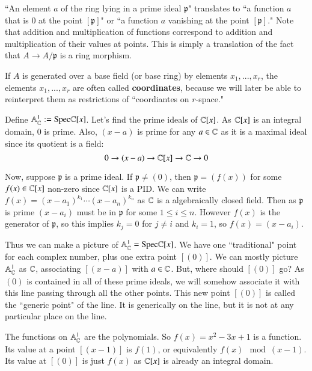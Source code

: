 ``An element $a$ of the ring lying in a prime ideal $\mathfrak{p}$" translates to ``a function $a$ that is $0$ at the point $[\mathfrak{p}]$" or ``a function $a$ vanishing at the point $[\mathfrak{p}]$." Note that addition and multiplication of functions correspond to addition and multiplication of their values at points. This is simply a translation of the fact that $A\rightarrow A/\mathfrak{p}$ is a ring morphism. 

If $A$ is generated over a base field (or base ring) by elements $x_1,...,x_r$, the elements $x_1,...,x_r$ are often called \textbf{coordinates}, because we will later be able to reinterpret them as restrictions of ``coordiantes on $r$-space."

\begin{example}
    Define $\mathbb{A}_{\mathbb C}^1 := \text{Spec} \mathbb C[x]$. Let's find the prime ideals of $\mathbb C[x]$. As $\mathbb C[x]$ is an integral domain, $0$ is prime. Also, $(x-a)$ is prime for any $a \in \mathbb C$ as it is a maximal ideal since its quotient is a field: $$0 \rightarrow (x-a)\rightarrow \mathbb C[x]\rightarrow \mathbb C\rightarrow 0$$

    Now, suppose $\mathfrak{p}$ is a prime ideal. If $\mathfrak{p} \neq (0)$, then $\mathfrak{p} = (f(x))$ for some $f(x) \in \mathbb C[x]$ non-zero since $\mathbb C[x]$ is a PID. We can write $f(x) = (x-a_1)^{k_1}\cdots(x-a_n)^{k_n}$ as $\mathbb C$ is a algebraically closed field. Then as $\mathfrak{p}$ is prime $(x-a_i)$ must be in $\mathfrak{p}$ for some $1\leq i \leq n$. However $f(x)$ is the generator of $\mathfrak{p}$, so this implies $k_j = 0$ for $j \neq i$ and $k_i = 1$, so $f(x) = (x-a_i)$.

    Thus we can make a picture of $\mathbb{A}_{\mathbb C}^1 = \text{Spec}\mathbb C[x]$. We have one ``traditional" point for each complex number, plus one extra point $[(0)]$. We can mostly picture $\mathbb{A}_{\mathbb C}^1$ as $\mathbb C$, associating $[(x-a)]$ with $a \in \mathbb C$. But, where should $[(0)]$ go? As $(0)$ is contained in all of these prime ideals, we will somehow associate it with this line passing through all the other points. This new point $[(0)]$ is called the ``generic point" of the line. It is generically on the line, but it is not at any particular place on the line.

    The functions on $\mathbb{A}_{\mathbb C}^1$ are the polynomials. So $f(x) = x^2-3x+1$ is a function. Its value at a point $[(x-1)]$ is $f(1)$, or equivalently $f(x) \mod (x-1)$. Its value at $[(0)]$ is just $f(x)$ as $\mathbb C[x]$ is already an integral domain.
\end{example}

